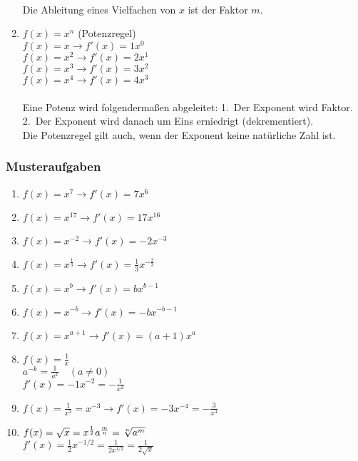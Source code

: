 \begin{enumerate}
    \vspace{0.1cm}
    \\
    Die Ableitung eines Vielfachen von $x$ ist der Faktor $m$.
    \item \begin{multicols}{2}
        $f(x) = x^{n}$ (Potenzregel)\\
        $f(x) = x \rightarrow f'(x) = 1x^{0}$\\
        $f(x) = x^{2} \rightarrow f'(x) = 2x^{1}$\\
        $f(x) = x^{3} \rightarrow f'(x) = 3x^{2}$\\
        $f(x) = x^{4} \rightarrow f'(x) = 4x^{3}$\\
    \\
    Eine Potenz wird folgendermaßen abgeleitet: 1.~Der Exponent wird Faktor. \\
    2.~Der Exponent wird danach um Eins erniedrigt (dekrementiert).\\
    Die Potenzregel gilt auch, wenn der Exponent keine natürliche Zahl ist.
    \end{multicols}
\end{enumerate}

\subsubsection{Musteraufgaben}
\begin{multicols}{2}
\begin{enumerate}
    \item $f(x) = x^7 \rightarrow f'(x) =7x^6$
    \item $f(x) = x^{17} \rightarrow f'(x) = 17x^{16}$
    \item $f(x) = x^{-2} \rightarrow f'(x) = -2x^{-3}$
    \item $f(x) = x^{\frac{1}{3}} \rightarrow f'(x) = \frac{1}{3}x^{-\frac{2}{3}}$
    \item $f(x) = x^b \rightarrow f'(x) = bx^{b-1}$
    \item $f(x) = x^{-b} \rightarrow f'(x) = -bx^{-b-1}$
    \item $f(x) = x^{a+1} \rightarrow f'(x) = (a+1)x^a$
    \item $f(x) = \frac{1}{x}$\\
    $a^{-k} = \frac{1}{a^k}\quad (a \neq 0)$\\
    $f'(x) = -1x^{-2} = -\frac{1}{x^2}$
    \item $f(x) = \frac{1}{x^3} = x^{-3} \rightarrow f'(x) = -3x^{-4} = -\frac{3}{x^4}$
    \item $f(x) = \sqrt{x} = x^{\frac{1}{2}}\\
    a^{\frac{m}{n}} = \sqrt[n]{a^m}$\\
    $f'(x) = \frac{1}{2}x^{-1/2} = \frac{1}{2x^{1/2}} = \frac{1}{2\sqrt{x}}$
\end{enumerate}
\end{multicols}

